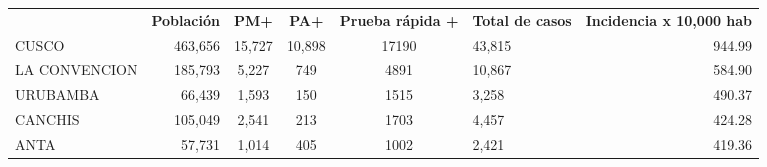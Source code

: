 \begin{tabular}{lrccclr}
	\rowcolor[HTML]{DCE6F1} 
	\multicolumn{1}{c}{\cellcolor[HTML]{DCE6F1}\textbf{PROVINCIA}} & \multicolumn{1}{c}{\cellcolor[HTML]{DCE6F1}\textbf{Población}} & \textbf{PM+}                                                & \textbf{PA+}         & \textbf{Prueba rápida +} & \multicolumn{1}{c}{\cellcolor[HTML]{DCE6F1}\textbf{Total de casos}} & \multicolumn{1}{c}{\cellcolor[HTML]{DCE6F1}\textbf{Incidencia x 10,000 hab}} \\
	\cellcolor[HTML]{FF5050}CUSCO                                  & 463,656                                                        & 15,727                                                      & 10,898               & 17190                    & 43,815                                                              & 944.99                                                                       \\
	\cellcolor[HTML]{F4B084}LA   CONVENCION                        & 185,793                                                        & 5,227                                                       & 749                  & 4891                     & 10,867                                                              & 584.90                                                                       \\
	\cellcolor[HTML]{F4B084}URUBAMBA                               & 66,439                                                         & 1,593                                                       & 150                  & 1515                     & 3,258                                                               & 490.37                                                                       \\
	\cellcolor[HTML]{FFE699}CANCHIS                                & 105,049                                                        & 2,541                                                       & 213                  & 1703                     & 4,457                                                               & 424.28                                                                       \\
	\cellcolor[HTML]{FFE699}ANTA                                   & 57,731                                                         & 1,014                                                       & 405                  & 1002                     & 2,421                                                               & 419.36                                                                       \\

\end{tabular}
